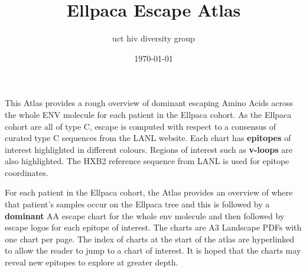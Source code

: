 \documentclass{article}
\title{Ellpaca Escape Atlas}
\author{uct hiv diversity group}
\date{\today}
\begin{document}
\setlength{\parindent}{0pt}

\thispagestyle{empty}
\begin{titlepage}
    \vspace*{5cm}
    \vspace{8cm}
    \vspace{3cm}
\end{titlepage}

\vspace{2cm}
\vspace{2cm}
\setlength{\columnsep}{2cm}
\begin{multicols}{2}
{\fontsize{24}{26}\selectfont
This Atlas provides a rough overview of dominant escaping Amino Acids
across the whole ENV molecule for each patient in the Ellpaca cohort.
As the Ellpaca cohort are all of type C, escape is computed with respect
to a consensus of curated type C sequences from the LANL website.
Each chart has {\bf epitopes} of interest highlighted in different colours. 
Regions of interest such as {\bf v-loops} are also highlighted. 
The HXB2 reference sequence from LANL is used for epitope coordinates.

\vfill\null
\columnbreak
For each patient in the Ellpaca cohort, the Atlas provides an overview of
where that patient's samples occur on the Ellpaca tree and this is followed
by a {\bf dominant} AA escape chart for the whole env molecule and then followed by 
escape logos for each epitope of interest. The charts are A3 Landscape PDFs 
with one chart per page. The index of charts at the start of the atlas are 
hyperlinked to allow the reader to jump to a chart of interest.
\vskip 12pt
It is hoped that the charts may reveal new epitopes to explore at greater depth.
\vfill\null
}
\end{multicols}
\newpage

\vspace{2cm}
\vspace{2cm}
\setlength{\columnsep}{2cm}
\begin{multicols*}{6}
{\fontsize{18}{18}\selectfont

}
\end{multicols*}
\restoregeometry
\end{document}
